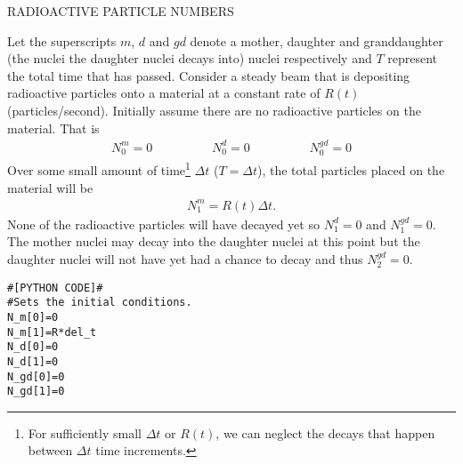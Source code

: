 \begin{center}
	RADIOACTIVE PARTICLE NUMBERS
\end{center}

Let the superscripts $m$, $d$ and $gd$ denote a mother, daughter and granddaughter (the nuclei the daughter nuclei decays into) nuclei respectively and $T$ represent the total time that has passed. Consider a steady beam that is depositing radioactive particles onto a material at a constant rate of $R(t)$ (particles/second). Initially assume there are no radioactive particles on the material. That is
\begin{align}
N^m_0=0 \hspace{2cm} N^d_0=0 \hspace{2cm} N^{gd}_0=0
\end{align}
Over some small amount of time\footnote{For sufficiently small $\Delta t$ or $R(t)$, we can neglect the decays that happen between $\Delta t$ time increments.} $\Delta t$ ($T=\Delta t$), the total particles placed on the material will be 
\begin{align}
N^m_1=R(t)\Delta t.
\end{align} 
None of the radioactive particles will have decayed yet so $N^d_1=0$ and $N^{gd}_1=0$. The mother nuclei may decay into the daughter nuclei at this point but the daughter nuclei will not have yet had a chance to decay and thus $N^{gd}_2=0$. 

\begin{lstlisting}
#[PYTHON CODE]#
#Sets the initial conditions. 
N_m[0]=0
N_m[1]=R*del_t
N_d[0]=0
N_d[1]=0
N_gd[0]=0
N_gd[1]=0
\end{lstlisting}

